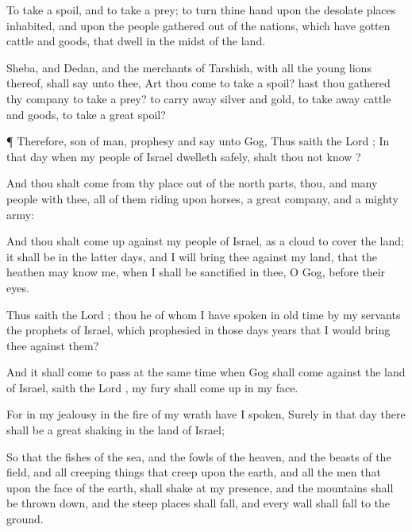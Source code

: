 {To
take a
spoil, and to
take a
prey; to
turn thine
hand upon the desolate
places
{}
inhabited, and upon the
people
{}
gathered out of the
nations, which have
gotten
cattle and
goods, that
dwell in the
midst of the
land.

Sheba, and
Dedan, and the
merchants of
Tarshish, with all the young
lions thereof, shall
say unto thee, Art thou
come to
take a
spoil? hast thou
gathered thy
company to
take a
prey? to carry
away
silver and
gold, to take
away
cattle and
goods, to
take a
great
spoil?


\par }{\PP {}¶ Therefore,
son of
man,
prophesy and
say unto
Gog, Thus
saith the
Lord
{}; In that
day when my
people of
Israel
dwelleth
safely, shalt thou not
know
{}?

And thou shalt
come from thy
place out of the
north
parts, thou, and
many
people with thee, all of them
riding upon
horses, a
great
company, and a
mighty
army:

And thou shalt come
up against my
people of
Israel, as a
cloud to
cover the
land; it shall be in the
latter
days, and I will
bring thee against my
land, that the
heathen may
know me, when I shall be
sanctified in thee, O
Gog, before their
eyes.

Thus
saith the
Lord
{};
{} thou he of whom I have
spoken in
old
time
by my
servants the
prophets of
Israel, which
prophesied in those
days
{}
years that I would
bring thee against them?

And it shall come to pass at the same
time
when
Gog shall
come against the
land of
Israel,
saith the
Lord
{},
{} my
fury shall come
up in my
face.

For in my
jealousy
{} in the
fire of my
wrath have I
spoken, Surely in that
day there shall be a
great
shaking in the
land of
Israel;

So that the
fishes of the
sea, and the
fowls of the
heaven, and the
beasts of the
field, and all creeping
things that
creep upon the
earth, and all the
men that
{} upon the
face of the
earth, shall
shake at my
presence, and the
mountains shall be thrown
down, and the steep
places shall
fall, and every
wall shall
fall to the
ground.

}
